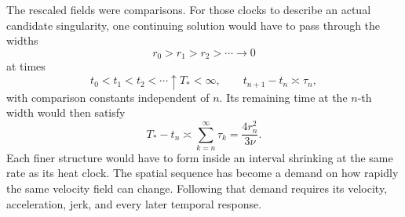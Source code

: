 The rescaled fields were comparisons.
For those clocks to describe an actual candidate singularity, one continuing \NavierStokes{} solution would have to pass through the widths
\[
  r_0>r_1>r_2>\cdots\longrightarrow0
\]
at times
\[
  t_0<t_1<t_2<\cdots\uparrow T_*<\infty,
  \qquad
  t_{n+1}-t_n\asymp\tau_n,
\]
with comparison constants independent of \(n\).
Its remaining time at the \(n\)-th width would then satisfy
\[
  T_*-t_n
  \asymp
  \sum_{k=n}^{\infty}\tau_k
  =
  \frac{4r_n^2}{3\nu}.
\]
Each finer structure would have to form inside an interval shrinking at the same rate as its heat clock.
The spatial sequence has become a demand on how rapidly the same velocity field can change.
Following that demand requires its velocity, acceleration, jerk, and every later temporal response.
